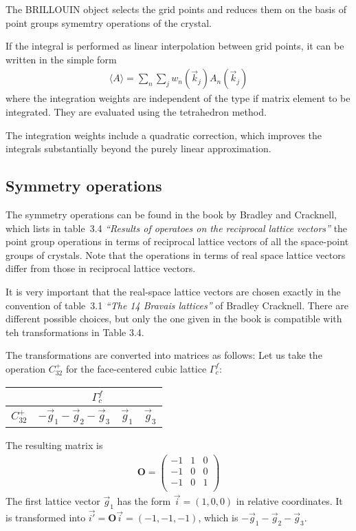 \documentclass[11pt,a4paper]{report}
\newcommand{\mat}[1]{\bm{#1}}  %
\begin{document}
The BRILLOUIN object selects the grid points and reduces them on the
basis of point groups symemtry operations of the crystal.

If the integral is performed as linear interpolation between grid
points, it can be written in the simple form
\begin{eqnarray}
\langle A\rangle=\sum_n\sum_{j} w_n(\vec{k}_j) A_n(\vec{k}_j)
\end{eqnarray}
where the integration weights are independent of the type if matrix
element to be integrated.\cite{bloechl94_prb49_16223} They are
evaluated using the tetrahedron method.

The integration weights include a quadratic correction, which improves
the integrals substantially beyond the purely linear
approximation.\cite{bloechl94_prb49_16223}

\subsection{Symmetry operations}
The symmetry operations can be found in the book by Bradley and
Cracknell\cite{bradley72_book}, which lists in table~3.4
\textit{``Results of operatoes on the reciprocal lattice vectors''}
the point group operations in terms of reciprocal lattice vectors of
all the space-point groups of crystals. Note that the operations in
terms of real space lattice vectors differ from those in reciprocal
lattice vectors.

It is very important that the real-space lattice vectors are chosen
exactly in the convention of table~3.1 \textit{``The 14 Bravais
  lattices''} of Bradley Cracknell. There are different possible
choices, but only the one given in the book is compatible with teh
transformations in Table 3.4.

The transformations are converted into matrices as follows: Let us
take the operation $C^+_{32}$ for the face-centered cubic lattice
$\Gamma^f_c$:
\begin{center}
\begin{tabular}{|l|c|c|c|}
\hline
&\multicolumn{3}{|c|}{$\Gamma^f_c$}\\
\hline
$C^+_{32}$ & $-\vec{g}_1-\vec{g}_2-\vec{g}_3$ & $\vec{g}_1$ & $\vec{g}_3$\\
\hline
\end{tabular}
\end{center}
The resulting matrix is
\begin{eqnarray}
\mat{O}=
\left(\begin{array}{ccc}
-1 & 1 & 0 \\
-1 & 0 & 0 \\
-1 & 0 & 1\\
\end{array}\right)
\end{eqnarray}
The first lattice vector $\vec{g}_1$ has the form $\vec{i}=(1,0,0)$ in
relative coordinates. It is transformed into $\vec{i'}=\mat{O}\vec{i}
=(-1,-1,-1)$, which is $-\vec{g}_1-\vec{g}_2-\vec{g}_3$.
\end{document}
